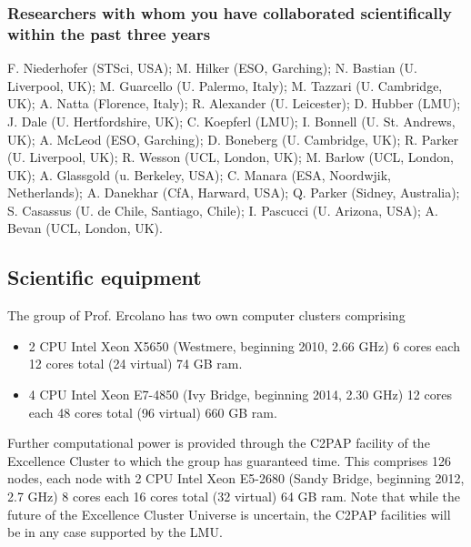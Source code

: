 \documentclass[10pt,fleqn,twoside]{article}
\newcommand{\Tcol}{\color{blue}}
\begin{document}
\subsubsection{\Tcol Researchers with whom you have collaborated scientifically within the past three years}


F. Niederhofer (STSci, USA); M. Hilker (ESO, Garching); N. Bastian (U. Liverpool,
UK); M. Guarcello (U. Palermo, Italy); M. Tazzari (U. Cambridge, UK);
A. Natta (Florence, Italy); R. Alexander (U. Leicester); D. Hubber
(LMU); J. Dale (U. Hertfordshire, UK); C. Koepferl (LMU); I. Bonnell
(U. St. Andrews, UK); A. McLeod (ESO, Garching); D. Boneberg
(U. Cambridge, UK); R. Parker (U. Liverpool, UK); R. Wesson (UCL,
London, UK); M. Barlow (UCL, London, UK); A. Glassgold (u. Berkeley,
USA); C. Manara (ESA, Noordwjik, Netherlands); A. Danekhar (CfA,
Harward, USA); Q. Parker (Sidney, Australia); S. Casassus
(U. de Chile, Santiago, Chile); I. Pascucci (U. Arizona, USA);
A. Bevan (UCL, London, UK).

\subsection{\Tcol Scientific equipment}

The group of Prof. Ercolano has two own computer clusters comprising 

\begin{itemize}
\item 2 CPU Intel Xeon X5650 (Westmere, beginning
2010, 2.66 GHz) 6 cores each 12 cores total (24 virtual) 74 GB ram.

\item 4 CPU Intel Xeon E7-4850 (Ivy Bridge, beginning 2014, 2.30 GHz)
12 cores each 48 cores total (96 virtual) 660 GB ram.

\end{itemize}

Further computational power is provided through the C2PAP facility of the Excellence Cluster to which
the group has guaranteed time. This comprises 126 nodes, each node with 2 CPU Intel Xeon E5-2680 (Sandy
Bridge, beginning 2012, 2.7 GHz) 8 cores each 16 cores total (32
virtual) 64 GB ram. Note that while the future of the Excellence
Cluster Universe is uncertain, the C2PAP facilities will be in any
case supported by the LMU. 
\end{document}
